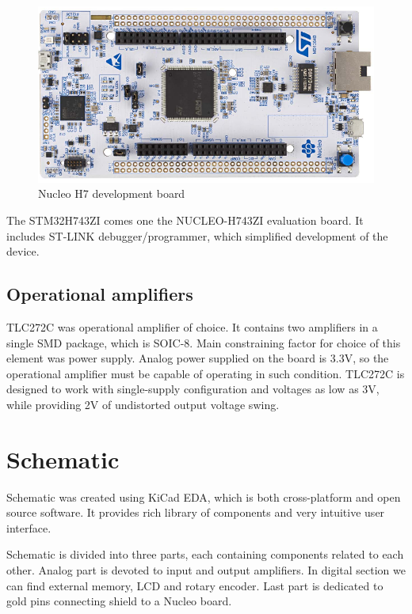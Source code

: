 \documentclass[a4paper,twoside,12pt]{book}
\begin{document}
\begin{figure}[H]
    \centering
    \includegraphics[width=\textwidth]{images/Nucleo}
    \caption{Nucleo H7 development board}
    \label{fig:Nucleo}
\end{figure}

The STM32H743ZI comes one the NUCLEO-H743ZI evaluation board.
It includes ST-LINK debugger/programmer,
which simplified development of the device. 
\cite{ST:UM2407}

\subsection {Operational amplifiers}

TLC272C was operational amplifier of choice.
It contains two amplifiers in a single SMD package, which is SOIC-8.
Main constraining factor for choice of this element was power supply.
Analog power supplied on the board is 3.3V, so the operational amplifier
must be capable of operating in such condition.
TLC272C is designed to work with single-supply configuration
and voltages as low as 3V,
while providing 2V of undistorted output voltage swing.

\section{Schematic}

Schematic was created using KiCad EDA,
which is both cross-platform and open source software.
It provides rich library of components and very intuitive user interface.

Schematic is divided into three parts,
each containing components related to each other.
Analog part is devoted to input and output amplifiers.
In digital section we can find external memory, LCD and rotary encoder.
Last part is dedicated to gold pins connecting shield to a Nucleo board.
\end{document}
